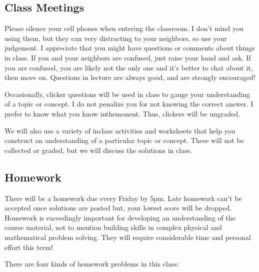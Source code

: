 \documentclass[letterpaper,10pt,english]{jupyterBook}
\begin{document}
\subsection{Class Meetings}
\label{\detokenize{content/0_course/design:class-meetings}}
\sphinxAtStartPar
{} Please silence your cell phones when entering the classroom.
I don’t mind you using them, but they can very distracting to your neighbors, so
use your judgement. I appreciate that you might have questions or comments about things in
class. If you and your neighbors are confused, just raise your hand and ask. If you are confused, you are likely not the only one and it’s better to chat about it, then move on.
Questions in lecture are always good, and are strongly encouraged!

\sphinxAtStartPar
{} Occasionally, clicker questions will be used in class to gauge your understanding of a topic or concept. I do not penalize you for not knowing the correct answer. I prefer to know what you know in\sphinxhyphen{}the\sphinxhyphen{}monent. Thus, clickers will be ungraded.

\sphinxAtStartPar
{} We will also use a variety of in\sphinxhyphen{}class activities and worksheets that help you construct an understanding of a particular topic or concept. These will not be collected or graded, but we will discuss the solutions in class.


\subsection{Homework}
\label{\detokenize{content/0_course/design:homework}}
\sphinxAtStartPar
There will be a homework due every Friday by 5pm. Late homework can’t be accepted once solutions are posted \sphinxhyphen{} but, your lowest score will be dropped. Homework is exceedingly important for developing an understanding of the course material, not to mention building skills in complex physical and mathematical problem solving. They will require considerable time and personal effort this term! 

\sphinxAtStartPar
There are four kinds of homework problems in this class:
\end{document}
